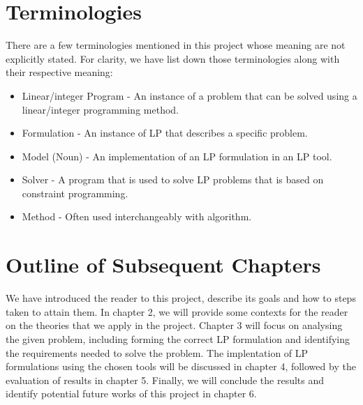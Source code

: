 \section{Terminologies}
There are a few terminologies mentioned in this project whose meaning are not explicitly stated.
For clarity, we have list down those terminologies along with their respective meaning:
\begin{itemize}
\item Linear/integer Program - An instance of a problem that can be solved using a linear/integer programming method.
\item Formulation - An instance of LP that describes a specific problem.
\item Model (Noun) - An implementation of an LP formulation in an LP tool.
\item Solver - A program that is used to solve LP problems that is based on constraint programming.
\item Method - Often used interchangeably with algorithm.
\end{itemize}

\section{Outline of Subsequent Chapters}
We have introduced the reader to this project, describe its goals and how to steps taken to attain them. In chapter 2,
we will provide some contexts for the reader on the theories that we apply in the project. Chapter 3 will focus on
analysing the given problem, including forming the correct LP formulation and identifying the requirements needed to solve the problem.
The implentation of LP formulations using the chosen tools will be discussed in chapter 4, followed by the evaluation of results
in chapter 5. Finally, we will conclude the results and identify potential future works
of this project in chapter 6.